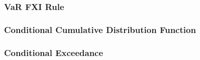 \documentclass{beamer}
\begin{document}
\begin{frame}
  \frametitle{VaR FXI Rule}
\end{frame}

\begin{frame}
  \frametitle{Conditional Cumulative Distribution Function}
\end{frame}

\begin{frame}
  \frametitle{Conditional Exceedance}
\end{frame}
\end{document}
